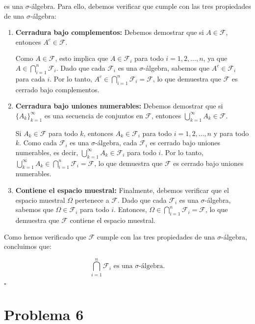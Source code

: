\documentclass[titlepage]{article} %
\begin{document}
es una $\sigma$-álgebra. Para ello, debemos verificar que cumple con las tres propiedades de una $\sigma$-álgebra:

\begin{enumerate}
    \item \textbf{Cerradura bajo complementos:}  
    Debemos demostrar que si $A \in \mathcal{F}$, entonces $A^c \in \mathcal{F}$.
    
    Como $A \in \mathcal{F}$, esto implica que $A \in \mathcal{F}_i$ para todo $i = 1, 2, \dots, n$, ya que $A \in \bigcap_{i=1}^n \mathcal{F}_i$. Dado que cada $\mathcal{F}_i$ es una $\sigma$-álgebra, sabemos que $A^c \in \mathcal{F}_i$ para cada $i$. Por lo tanto, $A^c \in \bigcap_{i=1}^n \mathcal{F}_i = \mathcal{F}$, lo que demuestra que $\mathcal{F}$ es cerrado bajo complementos.
    
    \item \textbf{Cerradura bajo uniones numerables:}  
    Debemos demostrar que si $\{A_k\}_{k=1}^{\infty}$ es una secuencia de conjuntos en $\mathcal{F}$, entonces $\bigcup_{k=1}^{\infty} A_k \in \mathcal{F}$.
    
    Si $A_k \in \mathcal{F}$ para todo $k$, entonces $A_k \in \mathcal{F}_i$ para todo $i = 1, 2, \dots, n$ y para todo $k$. Como cada $\mathcal{F}_i$ es una $\sigma$-álgebra, cada $\mathcal{F}_i$ es cerrado bajo uniones numerables, es decir, $\bigcup_{k=1}^{\infty} A_k \in \mathcal{F}_i$ para todo $i$. Por lo tanto, $\bigcup_{k=1}^{\infty} A_k \in \bigcap_{i=1}^n \mathcal{F}_i = \mathcal{F}$, lo que demuestra que $\mathcal{F}$ es cerrado bajo uniones numerables.
    
    \item \textbf{Contiene el espacio muestral:}  
    Finalmente, debemos verificar que el espacio muestral $\Omega$ pertenece a $\mathcal{F}$. Dado que cada $\mathcal{F}_i$ es una $\sigma$-álgebra, sabemos que $\Omega \in \mathcal{F}_i$ para todo $i$. Entonces, $\Omega \in \bigcap_{i=1}^n \mathcal{F}_i = \mathcal{F}$, lo que demuestra que $\mathcal{F}$ contiene el espacio muestral.
\end{enumerate}

Como hemos verificado que $\mathcal{F}$ cumple con las tres propiedades de una $\sigma$-álgebra, concluimos que:

\[
\bigcap_{i = 1}^{n} \mathcal{F}_{i} \text{ es una } \sigma\text{-álgebra.}
\]

\hfill $\square$

    \section*{\Large Problema 6}
\end{document}
